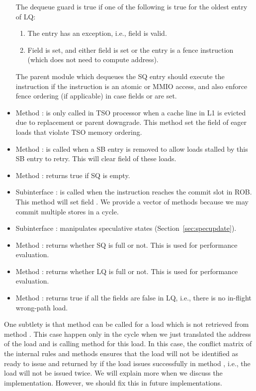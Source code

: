 \begin{itemize}
    The dequeue guard is true if one of the following is true for the oldest entry of LQ:
    \begin{enumerate}
        \item The entry has an exception, i.e., field  is valid.
        \item Field  is set, and either field  is set or the entry is a fence instruction (which does not need to compute address).
    \end{enumerate}
    The parent module which dequeues the SQ entry should execute the instruction if the instruction is an atomic or MMIO access, and also enforce fence ordering (if applicable) in case fields  or  are set.
    \item Method : is only called in TSO processor when a cache line in L1 is evicted due to replacement or parent downgrade.
    This method set the  field of eager loads that violate TSO memory ordering.
    \item Method : is called when a SB entry is removed to allow loads stalled by this SB entry to retry.
    This will clear field  of these loads.
    \item Method : returns true if SQ is empty.
    \item Subinterface : is called when the instruction reaches the commit slot in ROB.
    This method will set field .
    We provide a vector of methods because we may commit multiple stores in a cycle.
    \item Subinterface : manipulates speculative states (Section~\ref{sec:specupdate}).
    \item Method : returns whether SQ is full or not. This is used for performance evaluation.
    \item Method : returns whether LQ is full or not. This is used for performance evaluation.
    \item Method : returns true if all the  fields are false in LQ, i.e., there is no in-flight wrong-path load.
\end{itemize}

One subtlety is that method  can be called for a load which is not retrieved from method .
This case happen only in the cycle when we just translated the address of the load and is calling method  for this load.
In this case, the conflict matrix of the internal rules and methods ensures that the load will not be identified as ready to issue and returned by  if the load issues successfully in method , i.e., the load will not be issued twice.
We will explain more when we discuss the implementation.
However, we should fix this in future implementations.

